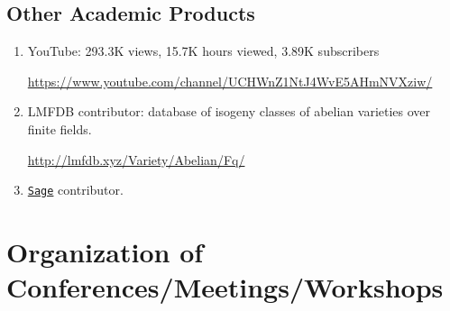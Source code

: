 \documentclass[a4paper,10pt]{article}
\begin{document}
\begin{enumerate}
\end{enumerate}

\subsection*{Other Academic Products}
\begin{enumerate}
	\item YouTube: 293.3K views, 15.7K hours viewed, 3.89K subscribers
	\begin{center}
		 \url{https://www.youtube.com/channel/UCHWnZ1NtJ4WvE5AHmNVXziw/}
	\end{center}
	\item LMFDB contributor: database of isogeny classes of abelian varieties over finite fields.
	 \begin{center}
	 	\url{http://lmfdb.xyz/Variety/Abelian/Fq/}
	 \end{center}
	\item \href{https://www.sagemath.org/}{\texttt{Sage}} contributor. 
			\

\end{enumerate}

\section*{Organization of Conferences/Meetings/Workshops}
\end{document}
